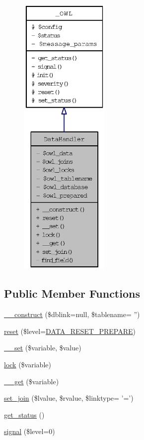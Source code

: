 \begin{figure}[H]
\begin{center}
\leavevmode
\includegraphics[height=400pt]{classDataHandler__coll__graph}
\end{center}
\end{figure}
\subsection*{Public Member Functions}
\begin{CompactItemize}
\item 
\hyperlink{classDataHandler_4eef16167dd9a5bc94bd0cb40ce1b180}{\_\-\_\-construct} (\$dblink=null, \$tablename= '')
\item 
\hyperlink{classDataHandler_b89e1aaad9cd0a37f1c7f13c1d9c0d57}{reset} (\$level=\hyperlink{class_8datahandler_8php_19a99423705b41e563424ae76d7fe184}{DATA\_\-RESET\_\-PREPARE})
\item 
\hyperlink{classDataHandler_16c81c9564a7feaf530ce5d51ed99df7}{\_\-\_\-set} (\$variable, \$value)
\item 
\hyperlink{classDataHandler_1229b35655a939fd3c1fe31184057632}{lock} (\$variable)
\item 
\hyperlink{classDataHandler_f58cbd10b032e4904fa15ce950d521e2}{\_\-\_\-get} (\$variable)
\item 
\hyperlink{classDataHandler_9b77733f02e9d6281fc40df110c0ba70}{set\_\-join} (\$lvalue, \$rvalue, \$linktype= '=')
\item 
\hyperlink{class__OWL_99ec771fa2c5c279f80152cc09e489a8}{get\_\-status} ()
\item 
\hyperlink{class__OWL_61c04b80fe17e2f1e339a6d6a89e45f3}{signal} (\$level=0)
\end{CompactItemize}
